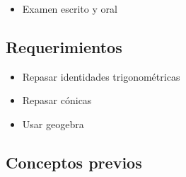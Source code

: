 \begin{itemize}
    \item Examen escrito y oral
\end{itemize}

\subsection{Requerimientos}

\begin{itemize}
    \item Repasar identidades trigonométricas
    \item Repasar cónicas 
    \item Usar geogebra 
\end{itemize}

\subsection{Conceptos previos}

